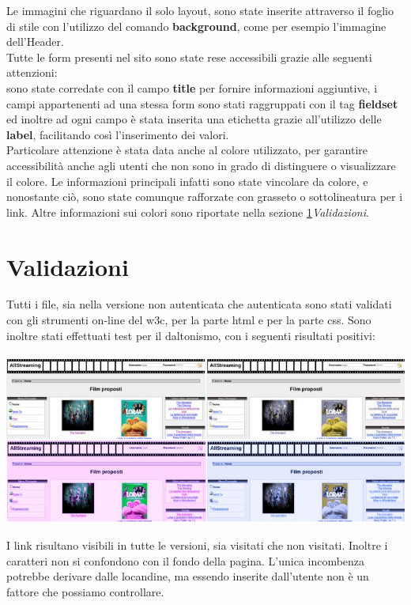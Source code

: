 Le immagini che riguardano il solo layout, sono state inserite attraverso il foglio di stile con l'utilizzo del comando \textbf{background}, come per esempio l'immagine dell'Header.\\

Tutte le form presenti nel sito sono state rese accessibili grazie alle seguenti attenzioni:\\
sono state corredate con il campo \textbf{title} per fornire informazioni aggiuntive, i campi appartenenti ad una stessa form sono stati raggruppati con il tag \textbf{fieldset} ed inoltre ad ogni campo è stata inserita una etichetta grazie all'utilizzo delle \textbf{label}, facilitando così l'inserimento dei valori.\\

Particolare attenzione è stata data anche al colore utilizzato, per garantire accessibilità anche agli utenti che non sono in grado di distinguere o visualizzare il colore. Le informazioni principali infatti sono state vincolare da colore, e nonostante ciò, sono state comunque rafforzate con grasseto o sottolineatura per i link.
Altre informazioni sui colori sono riportate nella sezione \ref{validazioni}\textit{Validazioni}.



\section{Validazioni}
\label{validazioni}
Tutti i file, sia nella versione non autenticata che autenticata sono stati validati con gli strumenti on-line del w3c, per la parte html e per la parte css.
Sono inoltre stati effettuati test per il daltonismo, con i seguenti risultati positivi:\\
\\ 
\includegraphics[scale=0.55]{images/test}


I link risultano visibili in tutte le versioni, sia visitati che non visitati. Inoltre i caratteri non si confondono con il fondo della pagina. L'unica incombenza potrebbe derivare dalle locandine, ma essendo inserite dall'utente non è un fattore che possiamo controllare.


